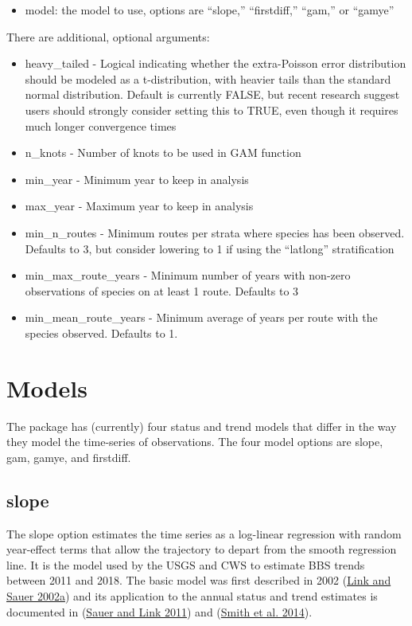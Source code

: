 \documentclass[
]{book}
\providecommand{\tightlist}{%
  \setlength{\itemsep}{0pt}\setlength{\parskip}{0pt}}
\begin{document}
\begin{itemize}
\tightlist
\item
  model: the model to use, options are ``slope,'' ``firstdiff,'' ``gam,'' or ``gamye''
\end{itemize}

There are additional, optional arguments:

\begin{itemize}
\item
  heavy\_tailed - Logical indicating whether the extra-Poisson error distribution should be modeled as a t-distribution, with heavier tails than the standard normal distribution. Default is currently FALSE, but recent research suggest users should strongly consider setting this to TRUE, even though it requires much longer convergence times
\item
  n\_knots - Number of knots to be used in GAM function
\item
  min\_year - Minimum year to keep in analysis
\item
  max\_year - Maximum year to keep in analysis
\item
  min\_n\_routes - Minimum routes per strata where species has been observed. Defaults to 3, but consider lowering to 1 if using the ``latlong'' stratification
\item
  min\_max\_route\_years - Minimum number of years with non-zero observations of species on at least 1 route. Defaults to 3
\item
  min\_mean\_route\_years - Minimum average of years per route with the species observed. Defaults to 1.
\end{itemize}

\hypertarget{models}{%
\section{Models}\label{models}}

The package has (currently) four status and trend models that differ in the way they model the time-series of observations. The four model options are slope, gam, gamye, and firstdiff.

\hypertarget{slope}{%
\subsection{slope}\label{slope}}

The slope option estimates the time series as a log-linear regression with random year-effect terms that allow the trajectory to depart from the smooth regression line. It is the model used by the USGS and CWS to estimate BBS trends between 2011 and 2018. The basic model was first described in 2002 (\protect\hyperlink{ref-link2002}{Link and Sauer 2002a}) and its application to the annual status and trend estimates is documented in (\protect\hyperlink{ref-sauer2011}{Sauer and Link 2011}) and (\protect\hyperlink{ref-smith2014}{Smith et al. 2014}).
\end{document}

